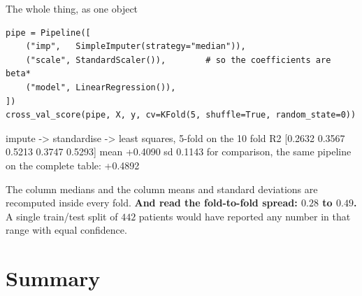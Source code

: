 \documentclass[aspectratio=169]{beamer}
\begin{document}
\begin{frame}[fragile,shrink=6]{The whole thing, as one object}
\begin{lstlisting}
pipe = Pipeline([
    ("imp",   SimpleImputer(strategy="median")),
    ("scale", StandardScaler()),        # so the coefficients are beta*
    ("model", LinearRegression()),
])
cross_val_score(pipe, X, y, cv=KFold(5, shuffle=True, random_state=0))
\end{lstlisting}
\begin{outblk}
impute -> standardise -> least squares, 5-fold on the 10%
   fold R2 [0.2632 0.3567 0.5213 0.3747 0.5293]
   mean +0.4090  sd 0.1143
   for comparison, the same pipeline on the complete table: +0.4892
\end{outblk}
\begin{center}\small
  The column medians and the column means and standard deviations are
  recomputed inside every fold. \textbf{And read the fold-to-fold spread:
  $0.28$ to $0.49$.} A single train/test split of $442$ patients would have
  reported any number in that range with equal confidence.
\end{center}
\end{frame}

\section{Summary}
\label{sec:summary}
\end{document}
